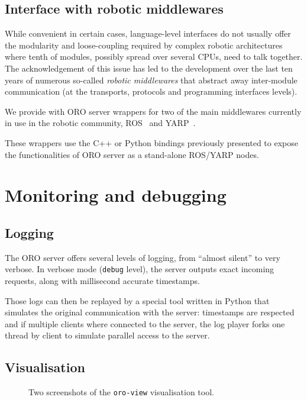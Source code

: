 \subsection{Interface with robotic middlewares}
\label{sect|interfacing-middlewares}

While convenient in certain cases, language-level interfaces do not usually
offer the modularity and loose-coupling required by complex robotic
architectures where tenth of modules, possibly spread over several CPUs, need
to talk together. The acknowledgement of this issue has led to the development
over the last ten years of numerous so-called \emph{robotic middlewares} that
abstract away inter-module communication (at the transports, protocols and
programming interfaces levels).

We provide with ORO server wrappers for two of the main middlewares currently
in use in the robotic community, ROS~\cite{Quigley2009} and
YARP~\cite{Metta2006}.

These wrappers use the C++ or Python bindings previously presented to expose
the functionalities of ORO server as a stand-alone ROS/YARP nodes.

\section{Monitoring and debugging}
\label{sect|monitoring}

\subsection{Logging}

The ORO server offers several levels of logging, from ``almost silent'' to very
verbose. In verbose mode ({\tt debug} level), the server outputs exact incoming
requests, along with millisecond accurate timestamps.

Those logs can then be replayed by a special tool written in Python that
simulates the original communication with the server: timestamps are respected
and if multiple clients where connected to the server, the log player forks one
thread by client to simulate parallel access to the server.

\subsection{Visualisation}

\begin{figure}
    \centering
    \caption{Two screenshots of the {\tt oro-view} visualisation tool.}
    \label{fig|oroview}
\end{figure}

